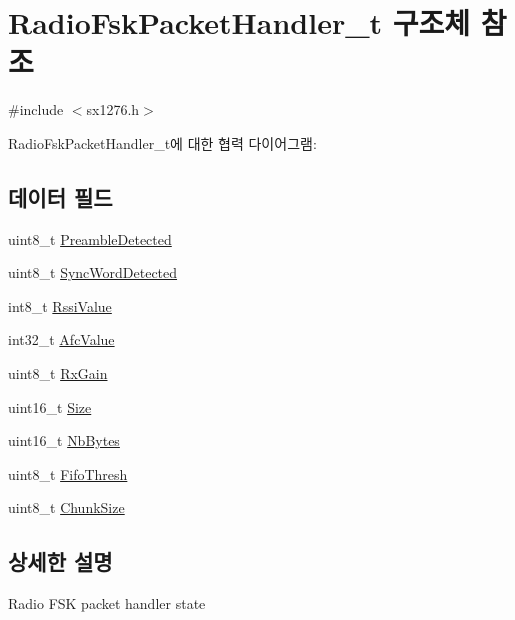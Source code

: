 \hypertarget{struct_radio_fsk_packet_handler__t}{}\section{Radio\+Fsk\+Packet\+Handler\+\_\+t 구조체 참조}
\label{struct_radio_fsk_packet_handler__t}


{\ttfamily \#include $<$sx1276.\+h$>$}



Radio\+Fsk\+Packet\+Handler\+\_\+t에 대한 협력 다이어그램\+:
\subsection*{데이터 필드}
\begin{DoxyCompactItemize}
\item 
uint8\+\_\+t \mbox{\hyperlink{struct_radio_fsk_packet_handler__t_a825f96ea9f64333634d9cdc9c20396cf}{Preamble\+Detected}}
\item 
uint8\+\_\+t \mbox{\hyperlink{struct_radio_fsk_packet_handler__t_a0cad12deb5c547254760b5d04bcf6eac}{Sync\+Word\+Detected}}
\item 
int8\+\_\+t \mbox{\hyperlink{struct_radio_fsk_packet_handler__t_a4f56aa0a3ff9dd112fb334584a237b4a}{Rssi\+Value}}
\item 
int32\+\_\+t \mbox{\hyperlink{struct_radio_fsk_packet_handler__t_a6325beb0c52e0aa5ab179b39c51ef1cc}{Afc\+Value}}
\item 
uint8\+\_\+t \mbox{\hyperlink{struct_radio_fsk_packet_handler__t_af952d69e210b5ac4fa8627bad9558fac}{Rx\+Gain}}
\item 
uint16\+\_\+t \mbox{\hyperlink{struct_radio_fsk_packet_handler__t_a7da24467a0654ce2d1b0d8d0a09eee4b}{Size}}
\item 
uint16\+\_\+t \mbox{\hyperlink{struct_radio_fsk_packet_handler__t_a494ce893cf63b9392915f08010d79244}{Nb\+Bytes}}
\item 
uint8\+\_\+t \mbox{\hyperlink{struct_radio_fsk_packet_handler__t_acca8dea20d49c991dc4c7b5dc6ca755b}{Fifo\+Thresh}}
\item 
uint8\+\_\+t \mbox{\hyperlink{struct_radio_fsk_packet_handler__t_a78ff61b19a17979295892ab899554676}{Chunk\+Size}}
\end{DoxyCompactItemize}


\subsection{상세한 설명}
Radio F\+SK packet handler state 


